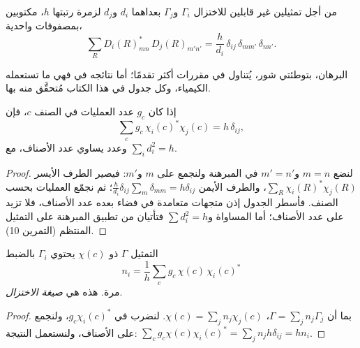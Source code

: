 \begin{theorem}\label{thm:b3:group-theory-applied:great-orthogonality}
من أجل تمثيلين غير قابلين للاختزال $\Gamma_i$ و$\Gamma_j$ بعداهما $d_i$
و$d_j$ لزمرة رتبتها $h$، مكتوبين بمصفوفات واحدية،
\[
\sum_R D_i(R)_{mn}^*\,D_j(R)_{m'n'} = \frac{h}{d_i}\,\delta_{ij}\,\delta_{mm'}\,\delta_{nn'}.
\]
\end{theorem}
\admitted

البرهان، بتوطئتي شور، يُتناول في مقررات أكثر تقدمًا؛ أما
نتائجه في  فهي ما تستعمله الكيمياء، وكل جدول 
في هذا الكتاب مُتحقَّق منه بها.

\begin{corollary}\label{cor:b3:group-theory-applied:characters}
إذا كان $g_c$ عدد العمليات في الصنف $c$، فإن
\[
\sum_cg_c\,\chi_i(c)^*\chi_j(c) = h\,\delta_{ij},
\]
وعدد  يساوي عدد الأصناف،
مع $\sum_id_i^2 = h$.
\end{corollary}

\begin{proof}
لنضع $m = n$ و$m' = n'$ في المبرهنة ولنجمع على $m$ و$m'$: فيصير الطرف
الأيسر $\sum_R\chi_i(R)^*\chi_j(R)$، والطرف الأيمن $\frac{h}{d_i}\delta_{ij}
\sum_{m}\delta_{mm} = h\delta_{ij}$؛ ثم نجمّع العمليات بحسب الصنف. فأسطر
الجدول إذن متجهات متعامدة في فضاء بعده عدد
الأصناف، فلا تزيد  على عدد
الأصناف؛ أما المساواة و$\sum d_i^2 = h$ فتأتيان من تطبيق
المبرهنة على التمثيل المنتظم (التمرين 10).
\end{proof}

\begin{theorem}\label{thm:b3:group-theory-applied:reduction}
التمثيل $\Gamma$ ذو  $\chi(c)$ يحتوي 
$\Gamma_i$ بالضبط
\[
n_i = \frac1h\sum_cg_c\,\chi(c)\,\chi_i(c)^*
\]
مرة. هذه هي \emph{صيغة الاختزال}.
\end{theorem}

\begin{proof}
بما أن $\Gamma = \sum_jn_j\Gamma_j$،  $\chi(c) = \sum_jn_j\chi_j(c)$.
لنضرب في $g_c\chi_i(c)^*$، ولنجمع على الأصناف، ولنستعمل النتيجة:
$\sum_cg_c\chi(c)\chi_i(c)^* = \sum_jn_jh\delta_{ij} = hn_i$.
\end{proof}

